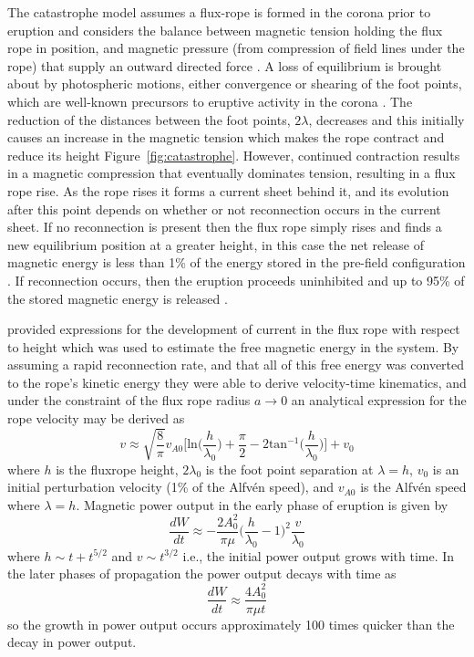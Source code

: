 The catastrophe model assumes a flux-rope is formed in the corona prior to eruption and considers the balance between magnetic tension holding the flux rope in position, and magnetic pressure (from compression of field lines under the rope) that supply an outward directed force \citep{forbes1991, lin2000, priest2000}. A loss of equilibrium is brought about by photospheric motions, either convergence or shearing of the foot points, which are well-known precursors to eruptive activity in the corona \citep{rust1972}. The reduction of the distances between the foot points, $2\lambda$, decreases and this initially 
causes an increase in the magnetic tension which makes the rope contract and reduce its height Figure~\ref{fig:catastrophe}. However, continued contraction results in a magnetic compression that eventually dominates tension, resulting in a flux rope rise. As the rope rises it forms a current sheet behind it, and its evolution after this point depends on whether or not reconnection occurs in the current sheet. If no reconnection is present then the flux rope simply rises and finds a new equilibrium position at a greater height, in this case the net release of magnetic energy is less than 1\% of the energy stored in the pre-field configuration \citep{forbes1991}. If reconnection occurs, then the eruption proceeds uninhibited and up to 95\% of the stored magnetic energy is released \citep{forbes1995}.

\citet{forbes1995} provided expressions for the development of current in the flux rope with respect to height which was used to estimate the free magnetic energy in the system. By assuming a rapid reconnection rate, and that all of this free energy was converted to the rope's kinetic energy they were able to derive velocity-time kinematics, and under the constraint of the flux rope radius $a\rightarrow 0$ an analytical expression for the rope velocity may be derived as \citep{priest2000}
\begin{equation}
v\approx \sqrt{  \frac{8}{\pi}  }v_{A0}\bigg[\mathrm{ln}\bigg( \frac{h}{\lambda_0}\bigg) + \frac{\pi}{2}  - 2\mathrm{tan}^{-1} \bigg( \frac{h}{\lambda_0}\bigg)\bigg] + v_0
\end{equation}
where $h$ is the fluxrope height, $2\lambda_0$ is the foot point separation at $\lambda=h$, $v_0$ is an initial perturbation velocity (1\% of the Alfv\'{e}n speed), and $v_{A0}$ is the Alfv\'{e}n speed where $\lambda=h$. Magnetic power output in the early phase of eruption is given by
\begin{equation}
\frac{dW}{dt} \approx -\frac{2A_0^2}{\pi\mu}\bigg( \frac{h}{\lambda_0} -1\bigg)^2\frac{v}{\lambda_0}
\end{equation}
where $h\sim t + t^{5/2}$ and $v\sim t^{3/2}$ i.e., the initial power output grows with time. In the later phases of propagation the power output decays with time as
\begin{equation}
\frac{dW}{dt} \approx \frac{4A_0^2}{\pi \mu t}
\end{equation}
so the growth in power output occurs approximately 100 times quicker than the decay in power output.

